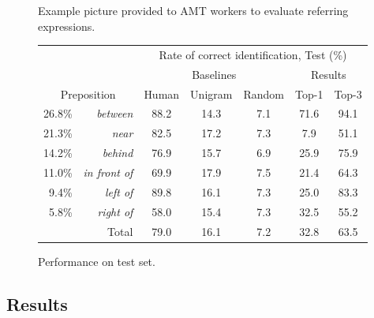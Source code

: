 \documentclass[conference]{IEEEtran}
\numberwithin{equation}{section}
\begin{document}
\begin{figure}[!h]
  \centering
  \caption{Example picture provided to AMT workers to evaluate referring expressions.}
  \label{fig:ref_expr_eval_pic}
\end{figure}


\begin{figure}[!b]
  \centering
  \begin{tabular}{| r r | c | c | c || c c |} \hline
     & & \multicolumn{5}{c|}{Rate of correct identification, Test (\%)} \\
     & & \multicolumn{3}{c||}{Baselines} & \multicolumn{2}{c|}{Results} \\
     \multicolumn{2}{|c|}{Preposition}
			                      &   Human & Unigram & Random &  Top-1 & Top-3 \\\hline
26.8\% & \textit{between}       & 88.2  & 14.3  & 7.1   & 71.6  & 94.1 \\
21.3\% & \textit{near}          & 82.5  & 17.2  & 7.3   & 7.9   & 51.1 \\
14.2\% & \textit{behind}        & 76.9  & 15.7  & 6.9   & 25.9  & 75.9 \\
11.0\% & \textit{in front of}   & 69.9  & 17.9  & 7.5   & 21.4  & 64.3 \\
9.4\% & \textit{left of}        & 89.8  & 16.1  & 7.3   & 25.0  & 83.3 \\
5.8\% & \textit{right of}       & 58.0  & 15.4  & 7.3   & 32.5  & 55.2 \\\hline\hline
    \multicolumn{2}{|r|}{Total} & 79.0  & 16.1  & 7.2   & 32.8  & 63.5 \\\hline
  \end{tabular}
  \caption{Performance on test set.}
  \label{fig:results}
\end{figure}

\subsection{Results}
\end{document}

